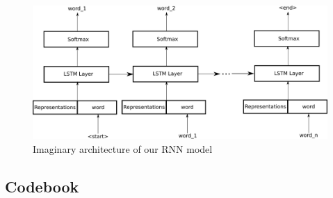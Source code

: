 \documentclass[11pt, a4paper]{article}
\begin{document}
\begin{figure}[H]
	\centering
	\includegraphics[width=\linewidth]{rnn.pdf}
	\caption{Imaginary architecture of our RNN model}
	\label{rnn}
\end{figure}


\begin{appendices}
	\section{Codebook}
	\label{appendix:codebook}
	
\end{appendices}
\end{document}
